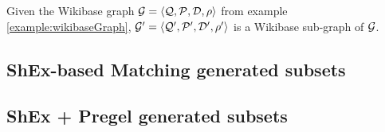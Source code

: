 \begin{example}
    Given the Wikibase graph $\mathcal{G}=\langle\mathcal{Q},\mathcal{P},\mathcal{D},\rho\rangle$ from example \ref{example:wikibaseGraph}, $\mathcal{G}'=\langle\mathcal{Q}',\mathcal{P}',\mathcal{D}',\rho'\rangle$ is a Wikibase sub-graph of $\mathcal{G}$.
\end{example}

\begin{table}[ht]
    \centering
    
\end{table}

\subsection{ShEx-based Matching generated subsets}

\subsection{ShEx + Pregel generated subsets}